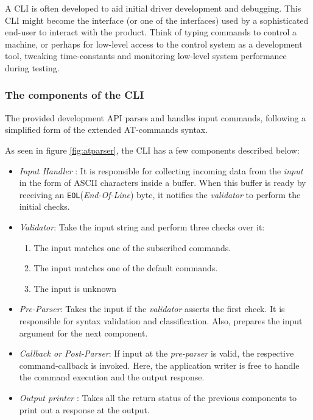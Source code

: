 A CLI is often developed to aid initial driver development and debugging. This CLI might become the interface (or one of the interfaces) used by a sophisticated end-user to interact with the product. Think of typing commands to control a machine, or perhaps for low-level access to the control system as a development tool, tweaking time-constants and monitoring low-level system performance during testing. 


\subsubsection{The components of the CLI}
The provided development API parses and handles input commands, following a simplified form of the extended AT-commands syntax. 



As seen in figure \ref{fig:atparser}, the CLI has a few components described below:
\begin{itemize}
    \item  \textit{Input Handler} : It is responsible for collecting incoming data from the \textit{input} in the form of ASCII characters inside a buffer. When this buffer is ready by receiving an \lstinline{EOL}(\textit{End-Of-Line}) byte, it notifies the \textit{validator} to perform the initial checks.
    \item \textit{Validator}: Take the input string and perform three checks over it:
    \begin{enumerate}
        \item The input matches one of the subscribed commands.
        \item The input matches one of the default commands.
        \item The input is unknown
    \end{enumerate}
    \item \textit{Pre-Parser}: Takes the input if the \textit{validator} asserts the first check. It is responsible for syntax validation and classification. Also, prepares the input argument for the next component.
    \item \textit{Callback or Post-Parser}: If input at the \textit{pre-parser} is valid, the respective command-callback is invoked. Here, the application writer is free to handle the command execution and the output response.
    \item \textit{Output printer} : Takes all the return status of the previous components to print out a response at the output.
\end{itemize}
\bigskip

